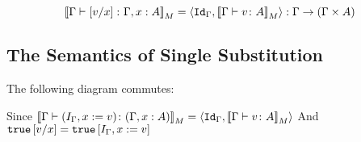 {    \begin{equation}
        \deno{\gtyperelation{\ssub{x}{v}}{\gax}} = \pr{\idg}{\deno{\gtyperelation{v}{A}}}: \G\rightarrow(\G\times A)
    \end{equation}
    \subsection{The Semantics of Single Substitution}

    The following diagram commutes:

    Since $\deno{\gtyperelation{(I_{\G}, x\setto v)}{(\gax)}} = \pr{\idg}{\deno{\gtyperelation{v}{A}}}$
    And $\t\ssub{x}{v} = \t\sub{I_{\G}, x\setto{v}}$
    }


\ifdefined\NoDocument
\else
\documentclass{report}


    \Substitution

\fi